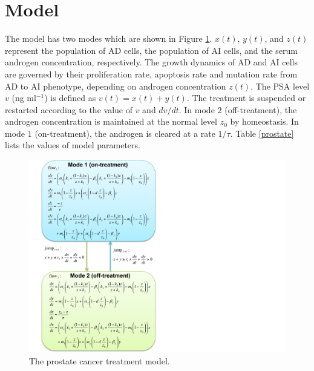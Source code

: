 \section{Model}

The model has two modes which are shown in Figure \ref{pmodel}. $x(t)$, $y(t)$, and $z(t)$ represent the population of AD cells, the population of AI cells, and the serum androgen concentration, respectively. The growth dynamics of AD and AI cells are governed by their proliferation rate, apoptosis rate and mutation rate from AD to AI phenotype, depending on androgen concentration $z(t)$. The PSA level $v$ (ng ml$^{-1}$) is defined as $v(t)=x(t)+y(t)$. The treatment is suspended or restarted according to the value of $v$ and ${dv}/{dt}$. In mode $2$ (off-treatment), the androgen concentration is maintained at the normal level $z_0$ by homeostasis. In mode $1$ (on-treatment), the androgen is cleared at a rate $1/\tau$. Table \ref{prostate} lists the values of model parameters.

\begin{figure}[htb]
\centering
\includegraphics[scale=0.6]{fig-prostate}
\caption{The prostate cancer treatment model.}
\label{pmodel}
\end{figure}

